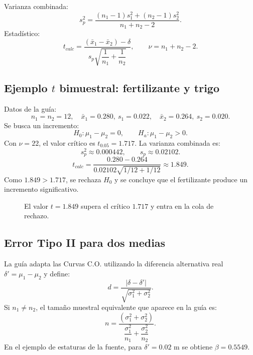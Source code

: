 \documentclass[11pt,a4paper]{article}
\begin{document}
Varianza combinada:
\[
 s_p^2=\frac{(n_1-1)s_1^2+(n_2-1)s_2^2}{n_1+n_2-2}.
\]
Estadístico:
\[
 t_{calc}=\frac{(\bar{x}_1-\bar{x}_2)-\delta}
 {s_p\sqrt{\dfrac1{n_1}+\dfrac1{n_2}}},
 \qquad \nu=n_1+n_2-2.
\]

\subsection{Ejemplo $t$ bimuestral: fertilizante y trigo}

Datos de la guía:
\[
n_1=n_2=12,\quad
\bar{x}_1=0.280,\ s_1=0.022,\quad
\bar{x}_2=0.264,\ s_2=0.020.
\]
Se busca un incremento:
\[
H_0:\mu_1-\mu_2=0,
\qquad
H_a:\mu_1-\mu_2>0.
\]
Con $\nu=22$, el valor crítico es $t_{0.05}=1.717$. La varianza combinada es:
\[
s_p^2\approx0.000442,
\qquad s_p\approx0.02102.
\]
\[
t_{calc}=\frac{0.280-0.264}{0.02102\sqrt{1/12+1/12}}\approx1.849.
\]
Como $1.849>1.717$, se rechaza $H_0$ y se concluye que el fertilizante produce un incremento significativo.

\begin{figure}[H]
\centering
{}
\caption{El valor $t=1.849$ supera el crítico $1.717$ y entra en la cola de rechazo.}
\end{figure}

\subsection{Error Tipo II para dos medias}

La guía adapta las Curvas C.O. utilizando la diferencia alternativa real $\delta'=\mu_1-\mu_2$ y define:
\[
d=\frac{|\delta-\delta'|}{\sqrt{\sigma_1^2+\sigma_2^2}}.
\]
Si $n_1\neq n_2$, el tamaño muestral equivalente que aparece en la guía es:
\[
 n=\frac{(\sigma_1^2+\sigma_2^2)}
 {\dfrac{\sigma_1^2}{n_1}+\dfrac{\sigma_2^2}{n_2}}.
\]
En el ejemplo de estaturas de la fuente, para $\delta'=0.02$ m se obtiene $\beta=0.5549$.
\end{document}
